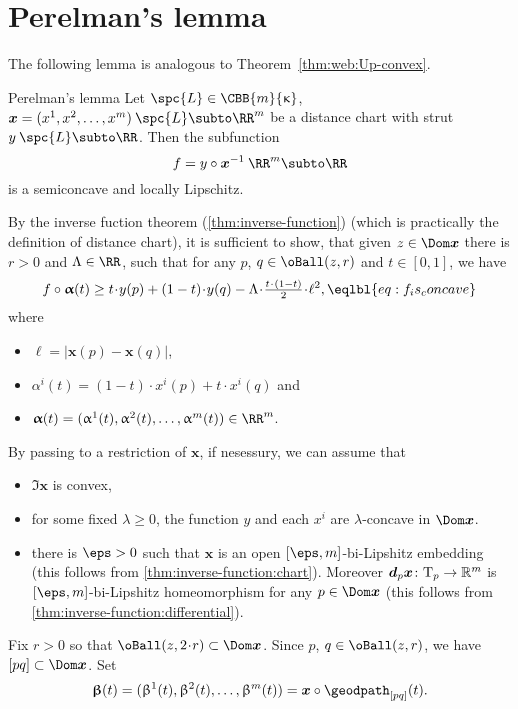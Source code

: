 \section{Perelman's lemma}\label{sec:perelman-lemma}

The following lemma is analogous to Theorem~\ref{thm:web:Up-convex}.

\begin{thm}{Perelman's lemma}\label{thm:inverse-function:concave}
Let $\spc{L}\in\CBB{m}{\kappa}$,
$\bm{x}=(x^1,x^2,\dots,x^m)\:\spc{L}\subto \RR^m$ be a distance  chart with strut $y\:\spc{L}\subto \RR$.
Then the subfunction 
\[f=y\circ\bm{x}^{-1}\:\RR^m\subto \RR\] 
is a semiconcave and locally Lipschitz.
\end{thm}

By the inverse fuction theorem (\ref{thm:inverse-function})
(which is practically the definition of distance chart),
it is sufficient to show, that given $z\in\Dom\bm{x}$ there is $r>0$ and $\Lambda\in\RR$,
such that for any $p$, $q\in\oBall(z,r)$ and $t\in[0,1]$, we have
\[f\circ\bm{\alpha}(t)
\ge 
t\cdot y(p)
+(1-t)\cdot y(q)
-\Lambda\cdot\tfrac{t\cdot(1-t)}{2}\cdot\ell^2,
\eqlbl{eq:f_is_concave}\]
where  
\begin{itemize}
\item $\ell=|\bm{x}(p)-\bm{x}(q)|$,
\item $\alpha^i(t)=(1-t)\cdot x^i(p)+t\cdot x^i(q)$ and 
\item $\bm{\alpha}(t)=(\alpha^1(t),\alpha^2(t),\dots,\alpha^m(t))\in \RR^m$.
\end{itemize}
By passing to a restriction of $\bm{x}$, if nesessury, 
we can assume that 
\begin{itemize}
\item $\Im\bm{x}$ is convex,
\item for some fixed $\lambda\ge 0$, the function $y$ 
and each $x^i$ are $\lambda$-concave in $\Dom\bm{x}$.
\item there is $\eps>0$ such that 
$\bm{x}$ is an open $[\eps,m]$-bi-Lipshitz embedding (this follows from \ref{thm:inverse-function:chart}). 
Moreover $\d_p\bm{x}\:\T_p\to\RR^m$ is $[\eps,m]$-bi-Lipshitz homeomorphism for any $p\in \Dom\bm{x}$ (this follows from \ref{thm:inverse-function:differential}).
\end{itemize}
Fix $r>0$ so that $\oBall(z,2\cdot r)\subset\Dom\bm{x}$.
Since $p$, $q\in\oBall(z,r)$, 
we have $[pq]\subset\Dom\bm{x}$.
Set 
\[\bm{\beta}(t)
=
(\beta^1(t),\beta^2(t),\dots,\beta^m(t))
=
\bm{x}\circ\geodpath_{[pq]}(t).\]
